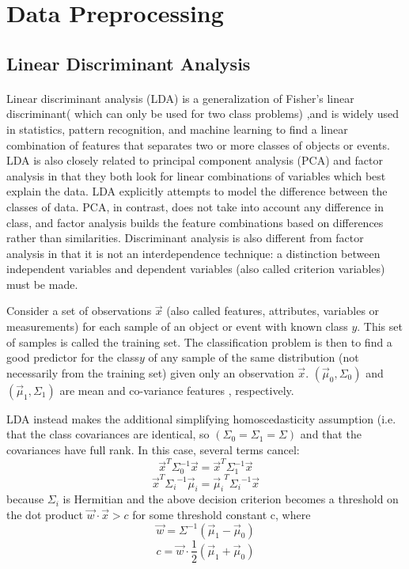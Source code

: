 \documentclass[12pt, a4paper]{report}
\begin{document}
\section{Data Preprocessing}

\subsection{Linear Discriminant Analysis}

\paragraph{} Linear discriminant analysis (LDA) is a generalization of Fisher's linear discriminant( which can only be used for two class problems) ,and is widely used in statistics, pattern recognition, and machine learning to find a linear combination of features that  separates two or more classes of objects or events.
LDA is also closely related to principal component analysis (PCA) and factor analysis in that they both look for linear combinations of variables which best explain the data. LDA explicitly attempts to model the difference between the classes of data. PCA, in contrast, does not take into account any difference in class, and factor analysis builds the feature combinations based on differences rather than similarities. Discriminant analysis is also different from factor analysis in that it is not an interdependence technique: a distinction between independent variables and dependent variables (also called criterion variables) must be made.

Consider a set of observations ${\vec {x}}$ (also called features, attributes, variables or measurements) for each sample of an object or event with known class $y$. This set of samples is called the training set. The classification problem is then to find a good predictor for the class$y$ of any sample of the same distribution (not necessarily from the training set) given only an observation ${\vec {x}}$.
$\left({\vec {\mu }}_{0},\Sigma _{0}\right)$ and$\left({\vec {\mu }}_{1},\Sigma _{1}\right)$ are mean and co-variance features , respectively. 

LDA instead makes the additional simplifying homoscedasticity assumption (i.e. that the class covariances are identical, so  $(\Sigma _{0}=\Sigma _{1}=\Sigma )$ and that the covariances have full rank. In this case, several terms cancel:
$${\vec {x}}^{T}\Sigma _{0}^{-1}{\vec {x}}={\vec {x}}^{T}\Sigma _{1}^{-1}{\vec {x}}$$
$${\displaystyle {\vec {x}}^{T}{\Sigma _{i}}^{-1}{\vec {\mu }}_{i}={{\vec {\mu }}_{i}}^{T}{\Sigma _{i}}^{-1}{\vec {x}}}$$ because $\Sigma _{i}$ is Hermitian
and the above decision criterion becomes a threshold on the dot product ${\vec {w}}\cdot {\vec {x}}>c$ for some threshold constant c, where
$${\vec {w}}=\Sigma ^{-1}({\vec {\mu }}_{1}-{\vec {\mu }}_{0})$$
$${\displaystyle c={\vec {w}}\cdot {\frac {1}{2}}({\vec {\mu }}_{1}+{\vec {\mu }}_{0})}$$
\end{document}
